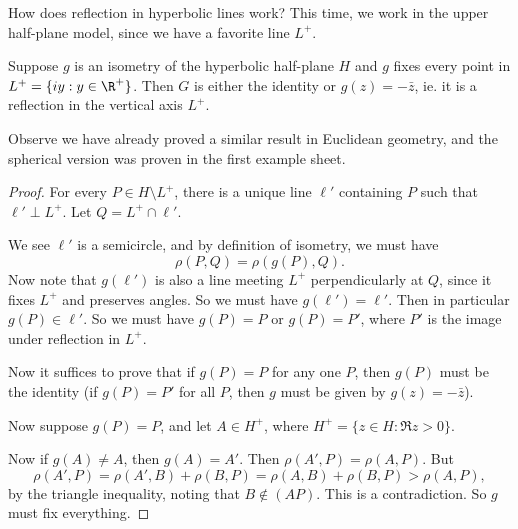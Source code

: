 \documentclass[a4paper]{article}
\begin{document}
How does reflection in hyperbolic lines work? This time, we work in the upper half-plane model, since we have a favorite line $L^+$.
\begin{lemma}
  Suppose $g$ is an isometry of the hyperbolic half-plane $H$ and $g$ fixes every point in $L^+ = \{iy: y \in \R^+\}$. Then $G$ is either the identity or $g(z) = -\bar{z}$, ie. it is a reflection in the vertical axis $L^+$.
\end{lemma}
Observe we have already proved a similar result in Euclidean geometry, and the spherical version was proven in the first example sheet.
\begin{proof}
  For every $P \in H \setminus L^+$, there is a unique line $\ell'$ containing $P$ such that $\ell' \perp L^+$. Let $Q = L^+ \cap \ell'$.
  \begin{center}
  \end{center}
  We see $\ell'$ is a semicircle, and by definition of isometry, we must have
  \[
    \rho(P, Q) = \rho(g(P), Q).
  \]
  Now note that $g(\ell')$ is also a line meeting $L^+$ perpendicularly at $Q$, since it fixes $L^+$ and preserves angles. So we must have $g(\ell') = \ell'$. Then in particular $g(P) \in \ell'$. So we must have $g(P) = P$ or $g(P) = P'$, where $P'$ is the image under reflection in $L^+$.

  Now it suffices to prove that if $g(P) = P$ for any one $P$, then $g(P)$ must be the identity (if $g(P) = P'$ for all $P$, then $g$ must be given by $g(z) = -\bar{z}$).

  Now suppose $g(P) = P$, and let $A \in H^+$, where $H^+ = \{z \in H: \Re z > 0\}$.
  \begin{center}
  \end{center}
  Now if $g(A) \not= A$, then $g(A) = A'$. Then $\rho(A', P) = \rho(A, P)$. But
  \[
    \rho(A', P) = \rho(A', B) + \rho(B, P) = \rho(A, B) + \rho(B, P) > \rho(A, P),
  \]
  by the triangle inequality, noting that $B \not\in (AP)$. This is a contradiction. So $g$ must fix everything.
\end{proof}
\end{document}
